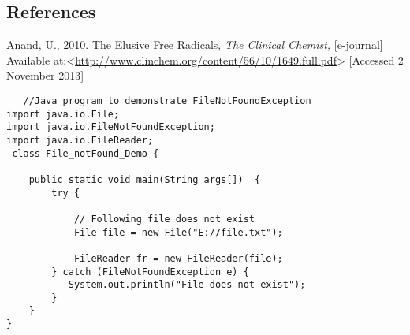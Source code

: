 \documentclass[12pt]{report}
\begin{document}
\subsection*{References}

Anand, U., 2010. The Elusive Free Radicals, \textit{The Clinical Chemist,} [e-journal] Available at:<\url{http://www.clinchem.org/content/56/10/1649.full.pdf}> [Accessed 2 November 2013]







 \begin{lstlisting}
   //Java program to demonstrate FileNotFoundException 
import java.io.File; 
import java.io.FileNotFoundException; 
import java.io.FileReader; 
 class File_notFound_Demo { 
  
    public static void main(String args[])  { 
        try { 
  
            // Following file does not exist 
            File file = new File("E://file.txt"); 
  
            FileReader fr = new FileReader(file); 
        } catch (FileNotFoundException e) { 
           System.out.println("File does not exist"); 
        } 
    } 
} 
    \end{lstlisting}

\fi
\end{document}
